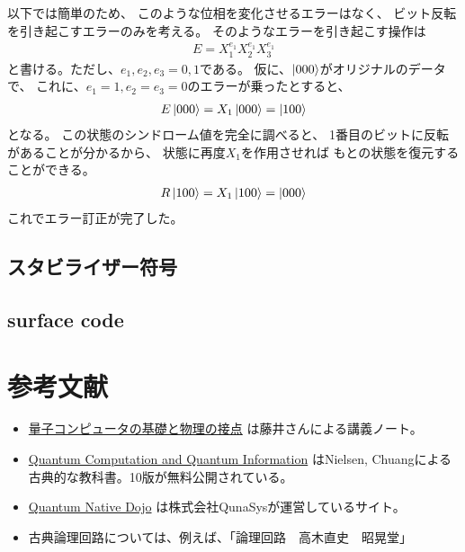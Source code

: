 \documentclass[]{ltjsarticle}
\begin{document}
以下では簡単のため、
このような位相を変化させるエラーはなく、
ビット反転を引き起こすエラーのみを考える。
そのようなエラーを引き起こす操作は
\begin{align}
    E = X_1^{e_1} X_2^{e_1} X_3^{e_1}
\end{align}
と書ける。ただし、$e_1,e_2,e_3 = 0,1$である。
仮に、$\ket{000}$がオリジナルのデータで、
これに、$e_1 = 1, e_2 = e_3 = 0$のエラーが乗ったとすると、
\begin{align}
    E\ket{000}
    =
    X_1\ket{000}
    =
    \ket{100}
\end{align}
となる。
この状態のシンドローム値を完全に調べると、
1番目のビットに反転があることが分かるから、
状態に再度$X_1$を作用させれば
もとの状態を復元することができる。
\begin{align}
    R\ket{100} = X_1\ket{100} = \ket{000}
\end{align}
これでエラー訂正が完了した。



\subsection{スタビライザー符号}


\subsection{surface code}

\section{参考文献}
\begin{itemize}
    \item \href{http://mercury.yukawa.kyoto-u.ac.jp/~bussei.kenkyu/wp/wp-content/uploads/6200-064217.pdf}{量子コンピュータの基礎と物理の接点}
        は藤井さんによる講義ノート。
    \item \href{http://mmrc.amss.cas.cn/tlb/201702/W020170224608149940643.pdf}{Quantum Computation and Quantum Information}
        はNielsen, Chuangによる古典的な教科書。10版が無料公開されている。
    \item \href{https://dojo.qulacs.org/ja/latest/}{Quantum Native Dojo}
        は株式会社QunaSysが運営しているサイト。
    \item 古典論理回路については、例えば、「論理回路　高木直史　昭晃堂」
\end{itemize}


%
%
\end{document}
